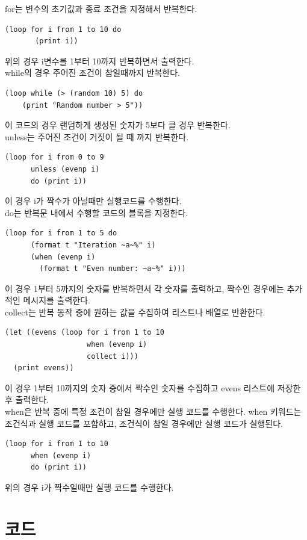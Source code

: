 \documentclass{article}
\begin{document}
for는 변수의 초기값과 종료 조건을 지정해서 반복한다.  
\begin{verbatim}
(loop for i from 1 to 10 do 
	   (print i))
\end{verbatim}
위의 경우 i변수를 1부터 10까지 반복하면서 출력한다.  
\\while의 경우 주어진 조건이 참일때까지 반복한다. 
\begin{verbatim}
(loop while (> (random 10) 5) do 
	(print "Random number > 5"))
\end{verbatim}
이 코드의 경우 랜덤하게 생성된 숫자가 5보다 클 경우 반복한다.\\ 
unless는 주어진 조건이 거짓이 될 때 까지 반복한다.
\begin{verbatim}
(loop for i from 0 to 9
      unless (evenp i)
      do (print i))
\end{verbatim}
이 경우 i가 짝수가 아닐때만 실행코드를 수행한다. 
\\do는 반복문 내에서 수행할 코드의 블록을 지정한다.
\begin{verbatim}
(loop for i from 1 to 5 do
      (format t "Iteration ~a~%" i)
      (when (evenp i)
        (format t "Even number: ~a~%" i)))
\end{verbatim}
이 경우 1부터 5까지의 숫자를 반복하면서 각 숫자를 출력하고, 짝수인 경우에는 추가적인 메시지를 출력한다. 
\\collect는 반복 동작 중에 원하는 값을 수집하여 리스트나 배열로 반환한다.
\begin{verbatim}
(let ((evens (loop for i from 1 to 10
                   when (evenp i)
                   collect i)))
  (print evens))
\end{verbatim}
이 경우 1부터 10까지의 숫자 중에서 짝수인 숫자를 수집하고 evens 리스트에 저장한 후 출력한다.
\\when은 반복 중에 특정 조건이 참일 경우에만 실행 코드를 수행한다. when 키워드는 조건식과 실행 코드를 포함하고, 조건식이 참일 경우에만 실행 코드가 실행된다.
\begin{verbatim}
(loop for i from 1 to 10
      when (evenp i)
      do (print i))
\end{verbatim}
위의 경우 i가 짝수일때만 실행 코드를 수행한다. 

\section{코드}
\end{document}
